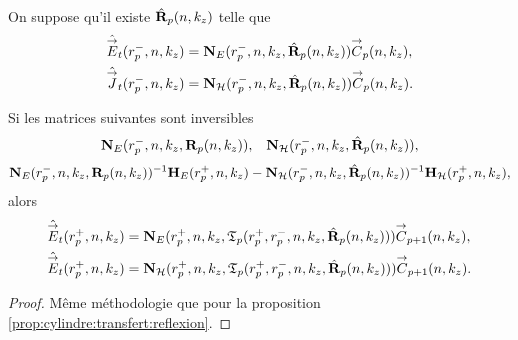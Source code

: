     \begin{prop}%
      \label{prop:cylindre:relevement:reflexion}{}~

      On suppose qu'il existe \(\hat{\mathbf{R}}_{p}(n,k_z)\) telle que 
      \begin{align*}
        \hat{{\overset{\rightarrow}{E}}}_t(r_{p}^-,n,k_z) &= \mathbf{N}_{E}(r_p^-,n,k_z,\hat{\mathbf{R}}_{p}(n,k_z)){\overset{\rightarrow}{C}}_{p}(n,k_z),
        \\
        \hat{{\overset{\rightarrow}{J}}}_t(r_{p}^-,n,k_z) &= \mathbf{N}_{\mathcal{H}}(r_p^-,n,k_z,\hat{\mathbf{R}}_{p}(n,k_z)){\overset{\rightarrow}{C}}_{p}(n,k_z).
      \end{align*}

      Si les matrices suivantes sont inversibles
      \begin{align*}
        \mathbf{N}_{E}(r_p^-,n,k_z,\mathbf{R}_{p}(n,k_z)), && \mathbf{N}_{\mathcal{H}}(r_p^-,n,k_z,\hat{\mathbf{R}}_{p}(n,k_z)),
      \end{align*}
      \begin{align*}
        \mathbf{N}_{E}(r_p^-,n,k_z,\mathbf{R}_{p}(n,k_z))^{-1}\mathbf{H}_{E}(r_p^+,n,k_z) - \mathbf{N}_{\mathcal{H}}(r_p^-,n,k_z,\hat{\mathbf{R}}_{p}(n,k_z))^{-1}\mathbf{H}_{\mathcal{H}}(r_p^+,n,k_z),
      \end{align*}
      alors
      \begin{align*}
        \hat{{\overset{\rightarrow}{E}}}_t(r_{p}^+,n,k_z) &= \mathbf{N}_{E}(r_p^+,n,k_z,\mathfrak{T}_p(r_p^+,r_p^-,n,k_z,\hat{\mathbf{R}}_{p}(n,k_z))){\overset{\rightarrow}{C}}_{p+1}(n,k_z),
        \\
        \hat{{\overset{\rightarrow}{E}}}_t(r_{p}^+,n,k_z) &= \mathbf{N}_{\mathcal{H}}(r_p^+,n,k_z,\mathfrak{T}_p(r_p^+,r_p^-,n,k_z,\hat{\mathbf{R}}_{p}(n,k_z))){\overset{\rightarrow}{C}}_{p+1}(n,k_z).
      \end{align*}
    \end{prop}

    \begin{proof}
      Même méthodologie que pour la proposition \ref{prop:cylindre:transfert:reflexion}.
    \end{proof}

